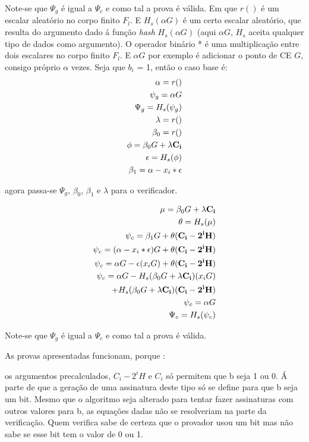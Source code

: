 Note-se que $\Psi_g$ é igual a $\Psi_c$ e como tal a prova é válida.\newline
Em que $r()$ é um escalar aleatório no corpo finito $F_l$. E $H_s(\alpha G)$ é um certo escalar aleatório, que resulta do argumento dado á função {\em hash} $H_s(\alpha G)$ (aqui $\alpha G$, $H_s$ aceita qualquer tipo de dados como argumento).   
O operador binário * é uma multiplicação entre dois escalares no corpo finito $F_l$. E $\alpha G$ por exemplo é adicionar o ponto de CE $G$, consigo próprio $\alpha$ vezes.  
\newpage
Seja que $b_i$ = 1, então o caso base é:
\begin{align*}
\alpha=r()\\
\psi_g = \alpha G\\
\Psi_g = H_s(\psi_g)\\
\lambda = r()\\
\beta_0=r()\\
\phi=\beta_0 G + \lambda \bold{C_i}\\
\epsilon = H_s(\phi)\\
\beta_1 = \alpha-x_i*\epsilon\\
\end{align*}

agora passa-se $\Psi_g$, $\beta_0$, $\beta_1$ e $\lambda$ para o verificador.  

\begin{align*}
\mu=\beta_0 G + \lambda \bold{C_i}\\
\theta= H_s(\mu)\\
\psi_c = \beta_1 G + \theta (\bold{C_i - 2^i H})\\
\psi_c = (\alpha-x_i*\epsilon) G + \theta (\bold{C_i - 2^i H})\\
\psi_c = \alpha G - \epsilon(x_i G)
                  + \theta (\bold{C_i - 2^i H})\\
\psi_c = \alpha G - H_s(\beta_0 G + \lambda \bold{C_i})(x_i G)\\
                 + H_s(\beta_0 G + \lambda \bold{C_i})(\bold{C_i - 2^i H})\\
\psi_c = \alpha G\\ 
\Psi_c = H_s(\psi_c)\\
\end{align*}

Note-se que $\Psi_g$ é igual a $\Psi_c$ e como tal a prova é válida.

As provas apresentadas funcionam, porque :

os argumentos precalculados, $C_i - 2^i H$ e $C_i$ só permitem que b seja 1 ou 0.
Á parte de que a geração de uma assinatura deste tipo só se define para que b seja um bit. Mesmo que o algoritmo seja alterado para tentar fazer assinaturas com outros valores para b, as equações dadas não se resolveriam na parte da verificação.
Quem verifica sabe de certeza que o provador usou um bit mas não sabe se esse bit tem o valor de 0 ou 1.


